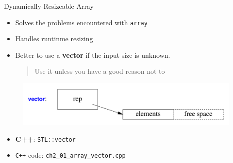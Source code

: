 \documentclass{beamer}
\begin{document}
\begin{frame}[fragile]{Dynamically-Resizeable Array}
    \begin{itemize}
    	\item Solves the problems encountered with \verb|array|
        \item Handles runtinme resizing
        \item Better to use a \textbf{vector} if the input size is unknown.               \begin{quote}
                    Use it unless you have a good reason not to
                \end{quote}
     \end{itemize}
     
      \begin{figure}
	    \centering
        \includegraphics[scale=0.25]{imgs/2-LDS/vector.png}
        \label{fig:vector}
	  \end{figure}
	  
	  \begin{itemize}
        \item \textbf{C++}: \verb|STL::vector|
        \item \color{red}\verb|C++| code: \verb|ch2_01_array_vector.cpp|\color{black}
    \end{itemize}
\end{frame}
\end{document}
